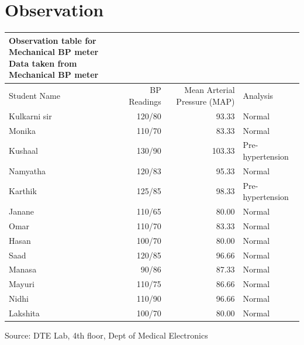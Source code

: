 \documentclass[
  11pt,
  letterpaper,
  DIV=11,
  numbers=noendperiod]{scrreprt}
\begin{document}
\section{Observation}\label{observation}

\setlength{\LTpost}{0mm}
\begin{longtable*}{lrrl}
\caption*{
{\large Observation table for Mechanical BP meter} \\ 
{\small Data taken from Mechanical BP meter}
} \\ 
\toprule
Student Name & BP Readings & Mean Arterial Pressure (MAP) & Analysis \\ 
\midrule\addlinespace[2.5pt]
Kulkarni sir & 120/80 & 93.33 & Normal \\ 
Monika & 110/70 & 83.33 & Normal \\ 
Kushaal & 130/90 & 103.33 & Pre-hypertension \\ 
Namyatha & 120/83 & 95.33 & Normal \\ 
Karthik & 125/85 & 98.33 & Pre-hypertension \\ 
Janane & 110/65 & 80.00 & Normal \\ 
Omar & 110/70 & 83.33 & Normal \\ 
Hasan & 100/70 & 80.00 & Normal \\ 
Saad & 120/85 & 96.66 & Normal \\ 
Manasa & 90/86 & 87.33 & Normal \\ 
Mayuri & 110/75 & 86.66 & Normal \\ 
Nidhi & 110/90 & 96.66 & Normal \\ 
Lakshita & 100/70 & 80.00 & Normal \\ 
\bottomrule
\end{longtable*}
\begin{minipage}{\linewidth}
Source: DTE Lab, 4th floor, Dept of Medical Electronics\\
\end{minipage}
\end{document}
